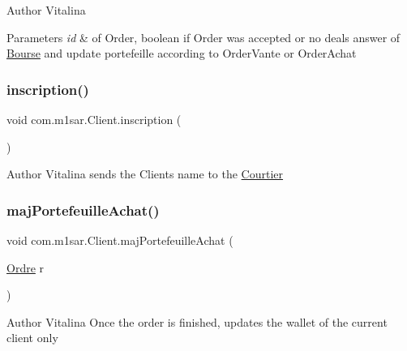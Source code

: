 \begin{DoxyAuthor}{Author}
Vitalina 
\end{DoxyAuthor}

\begin{DoxyParams}{Parameters}
{\em id} & of Order, boolean if Order was accepted or no deals answer of \hyperlink{classcom_1_1m1sar_1_1_bourse}{Bourse} and update portefeille according to Order\+Vante or Order\+Achat \\
\hline
\end{DoxyParams}
\mbox{\label{classcom_1_1m1sar_1_1_client_ac6681e529e1a045aae86e571dbfea5e3}} 
\subsubsection{\texorpdfstring{inscription()}{inscription()}}
{\footnotesize\ttfamily void com.\+m1sar.\+Client.\+inscription (\begin{DoxyParamCaption}{ }\end{DoxyParamCaption})}

\begin{DoxyAuthor}{Author}
Vitalina sends the Clients name to the \hyperlink{classcom_1_1m1sar_1_1_courtier}{Courtier} 
\end{DoxyAuthor}
\mbox{\label{classcom_1_1m1sar_1_1_client_ae58f81c93ca69cc75c923e91f758d75f}} 
\subsubsection{\texorpdfstring{maj\+Portefeuille\+Achat()}{majPortefeuilleAchat()}}
{\footnotesize\ttfamily void com.\+m1sar.\+Client.\+maj\+Portefeuille\+Achat (\begin{DoxyParamCaption}\item[{\hyperlink{classcom_1_1m1sar_1_1_ordre}{Ordre}}]{r }\end{DoxyParamCaption})}

\begin{DoxyAuthor}{Author}
Vitalina Once the order is finished, updates the wallet of the current client only 
\end{DoxyAuthor}

